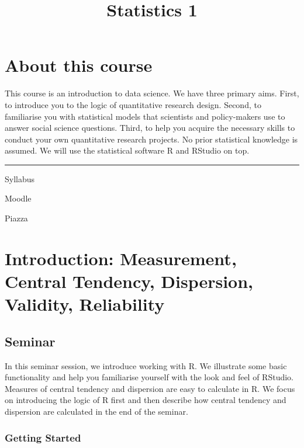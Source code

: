 \documentclass[]{book}
\title{Statistics 1}
\author{}
\date{}
\theoremstyle{definition}
\theoremstyle{definition}
\theoremstyle{definition}
\theoremstyle{remark}
\begin{document}
\maketitle

{
\setcounter{tocdepth}{1}
\tableofcontents
}
\chapter*{About this course}\label{about-this-course}

This course is an introduction to data science. We have three primary
aims. First, to introduce you to the logic of quantitative research
design. Second, to familiarise you with statistical models that
scientists and policy-makers use to answer social science questions.
Third, to help you acquire the necessary skills to conduct your own
quantitative research projects. No prior statistical knowledge is
assumed. We will use the statistical software R and RStudio on top.

\begin{center}\rule{0.5\linewidth}{\linethickness}\end{center}

Syllabus

Moodle

Piazza

\chapter{Introduction: Measurement, Central Tendency, Dispersion,
Validity,
Reliability}\label{introduction-measurement-central-tendency-dispersion-validity-reliability}

\section{Seminar}\label{seminar}

In this seminar session, we introduce working with R. We illustrate some
basic functionality and help you familiarise yourself with the look and
feel of RStudio. Measures of central tendency and dispersion are easy to
calculate in R. We focus on introducing the logic of R first and then
describe how central tendency and dispersion are calculated in the end
of the seminar.

\subsection{Getting Started}\label{getting-started}
\end{document}
